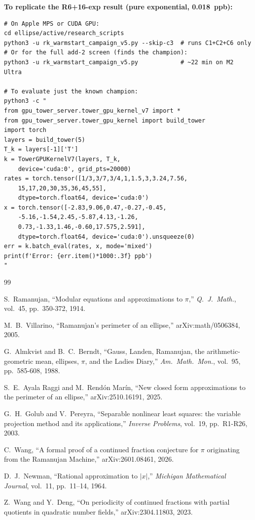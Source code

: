 \documentclass[12pt]{article}
\begin{document}
\medskip\noindent\textbf{To replicate the R6+16-exp result (pure exponential, 0.018~ppb):}
\begin{verbatim}
# On Apple MPS or CUDA GPU:
cd ellipse/active/research_scripts
python3 -u rk_warmstart_campaign_v5.py --skip-c3  # runs C1+C2+C6 only
# Or for the full add-2 screen (finds the champion):
python3 -u rk_warmstart_campaign_v5.py            # ~22 min on M2 Ultra

# To evaluate just the known champion:
python3 -c "
from gpu_tower_server.tower_gpu_kernel_v7 import *
from gpu_tower_server.tower_gpu_kernel import build_tower
import torch
layers = build_tower(5)
T_k = layers[-1]['T']
k = TowerGPUKernelV7(layers, T_k,
    device='cuda:0', grid_pts=20000)
rates = torch.tensor([1/3,3/7,3/4,1,1.5,3,3.24,7.56,
    15,17,20,30,35,36,45,55],
    dtype=torch.float64, device='cuda:0')
x = torch.tensor([-2.83,9.06,0.47,-0.27,-0.45,
    -5.16,-1.54,2.45,-5.87,4.13,-1.26,
    0.73,-1.33,1.46,-0.60,17.575,2.591],
    dtype=torch.float64, device='cuda:0').unsqueeze(0)
err = k.batch_eval(rates, x, mode='mixed')
print(f'Error: {err.item()*1000:.3f} ppb')
"
\end{verbatim}

\begin{thebibliography}{99}

S.~Ramanujan, ``Modular equations and approximations to $\pi$,''
\textit{Q.\ J.\ Math.}, vol.~45, pp.~350-372, 1914.

M.~B.~Villarino, ``Ramanujan's perimeter of an ellipse,''
arXiv:math/0506384, 2005.

G.~Almkvist and B.~C.~Berndt, ``Gauss, Landen, Ramanujan, the
arithmetic-geometric mean, ellipses, $\pi$, and the Ladies Diary,''
\textit{Am.\ Math.\ Mon.}, vol.~95, pp.~585-608, 1988.

S.~E.~Ayala Raggi and M.~Rend\'on Mar\'in, ``New closed form approximations to the
perimeter of an ellipse,'' arXiv:2510.16191, 2025.

G.~H.~Golub and V.~Pereyra, ``Separable nonlinear least squares: the variable projection method and its applications,''
\textit{Inverse Problems}, vol.~19, pp.~R1-R26, 2003.

C.~Wang, ``A formal proof of a continued fraction conjecture for $\pi$ originating from the Ramanujan Machine,''
arXiv:2601.08461, 2026.

D.~J.~Newman, ``Rational approximation to $|x|$,''
\textit{Michigan Mathematical Journal}, vol.~11, pp.~11--14, 1964.

Z.~Wang and Y.~Deng, ``On periodicity of continued fractions with partial
quotients in quadratic number fields,'' arXiv:2304.11803, 2023.

\end{thebibliography}
\end{document}
